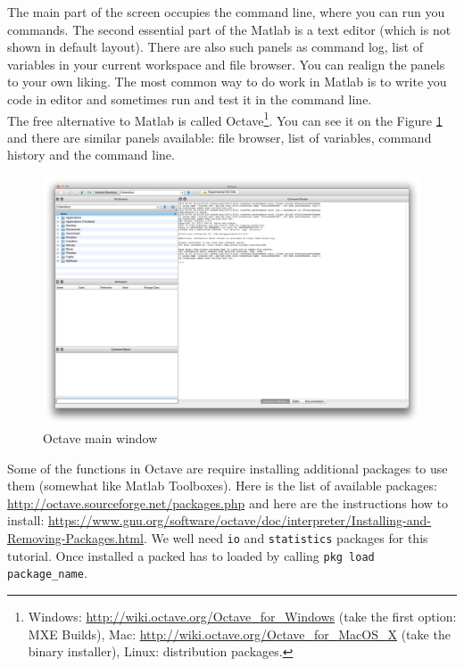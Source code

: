 \documentclass[a4paper,11pt]{article}
\begin{document}
The main part of the screen occupies the command line, where you can run you commands. The second essential part of the Matlab is a text editor (which is not shown in default layout). There are also such panels as command log, list of variables in your current workspace and file browser. You can realign the panels to your own liking. The most common way to do work in Matlab is to write you code in editor and sometimes run and test it in the command line.\\

The free alternative to Matlab is called Octave\footnote{Windows: \url{http://wiki.octave.org/Octave_for_Windows} (take the first option: MXE Builds), Mac: \url{http://wiki.octave.org/Octave_for_MacOS_X} (take the binary installer), Linux: distribution packages.}. You can see it on the Figure \ref{fig:octavegui} and there are similar panels available: file browser, list of variables, command history and the command line.

\begin{figure}[H]
   \centering
   \includegraphics[width=1\textwidth]{octave.png} 
   \caption{Octave main window}
   \label{fig:octavegui}
\end{figure}

Some of the functions in Octave are require installing additional packages to use them (somewhat like Matlab Toolboxes). Here is the list of available packages: \url{http://octave.sourceforge.net/packages.php} and here are the instructions how to install: \url{https://www.gnu.org/software/octave/doc/interpreter/Installing-and-Removing-Packages.html}. We well need  \texttt{io} and \texttt{statistics} packages for this tutorial. Once installed a packed has to loaded by calling \texttt{pkg load package\_name}.\\
\end{document}
